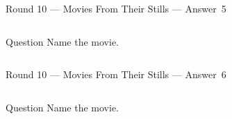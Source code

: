 \documentclass[11pt]{beamer}
\begin{document}
\begin{frame}[t]{Round 10 --- Movies From Their Stills --- \mbox{Answer 5}}
    \vspace{-0.5em}
    \begin{columns}[T,totalwidth=\linewidth]
        \begin{column}{0.32\linewidth}
            \begin{block}{Question}
                Name the movie.
            \end{block}
        \end{column}
        \begin{column}{0.65\linewidth}
            \begin{center}
                \texttt{[image: \{Images/taxidriver]}.jpg}
            \end{center}
        \end{column}
    \end{columns}
\end{frame}
\begin{frame}[t]{Round 10 --- Movies From Their Stills --- \mbox{Answer 6}}
    \vspace{-0.5em}
    \begin{columns}[T,totalwidth=\linewidth]
        \begin{column}{0.32\linewidth}
            \begin{block}{Question}
                Name the movie.
            \end{block}
        \end{column}
        \begin{column}{0.65\linewidth}
            \begin{center}
                \texttt{[image: \{Images/inbruges]}.jpg}
            \end{center}
        \end{column}
    \end{columns}
\end{frame}
\end{document}
